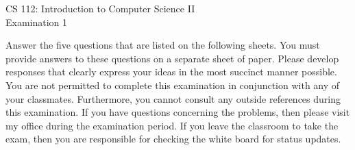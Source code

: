 \documentclass[12pt]{article}
\def\widow#1{\vskip #1\vbadness10000\penalty-200\vskip-#1}
\begin{document}
\def\widow#1{\vskip #1\vbadness10000\penalty-200\vskip-#1}

\begin{center}

CS 112: Introduction to Computer Science II \\
Examination 1 \\

\end{center}

\noindent
Answer the five questions that are listed on the following sheets.
You must provide answers to these questions on a separate sheet of
paper.  Please develop responses that clearly express your ideas in
the most succinct manner possible.  You are not permitted to complete
this examination in conjunction with any of your classmates.
Furthermore, you cannot consult any outside references during this
examination.  If you have questions concerning the problems, then
please visit my office during the examination period.  If you leave
the classroom to take the exam, then you are responsible for checking
the white board for status updates.

\newpage
\end{document}
